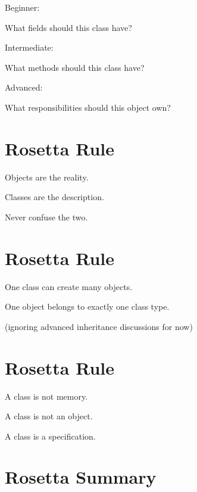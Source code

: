 \documentclass[11pt,a4paper]{book}
\begin{document}
Beginner:

\begin{center}
What fields should this class have?
\end{center}

Intermediate:

\begin{center}
What methods should this class have?
\end{center}

Advanced:

\begin{center}
What responsibilities should this object own?
\end{center}


\section{Rosetta Rule}

Objects are the reality.

Classes are the description.

Never confuse the two.


\section{Rosetta Rule}

One class can create many objects.

One object belongs to exactly one class type.

(ignoring advanced inheritance discussions for now)


\section{Rosetta Rule}

A class is not memory.

A class is not an object.

A class is a specification.


\section{Rosetta Summary}
\end{document}
